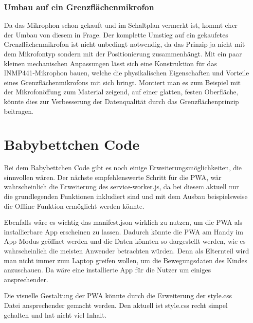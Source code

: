 \subsubsection{Umbau auf ein Grenzflächenmikrofon}
Da das Mikrophon schon gekauft und im Schaltplan vermerkt ist, kommt eher der Umbau von diesem in Frage. Der komplette Umstieg auf ein gekaufetes Grenzflächenmikrofon ist nicht unbedingt 
notwendig, da das Prinzip ja nicht mit dem Mikrofontyp sondern mit der Positionierung zusammenhängt. Mit ein paar kleinen mechanischen Anpassungen lässt sich eine Konstruktion 
für das INMP441-Mikrophon bauen, welche die physikalischen Eigenschaften und Vorteile eines Grenzflächenmikrofons mit sich bringt. Montiert man es zum Beispiel mit der Mikrofonöffung 
zum Material zeigend, auf einer glatten, festen Oberfläche, könnte dies zur Verbesserung der Datenqualität durch das Grenzflächenprinzip beitragen.

\section[Babybettchen Code]{Babybettchen Code\authorlinda}
Bei dem Babybettchen Code gibt es noch einige Erweiterungsmöglichkeiten, die sinnvollen wären. Der nächste empfehlenswerte Schritt für die PWA, wär wahrscheinlich die Erweiterung des service-worker.js, da bei diesem aktuell nur die grundlegenden Funktionen inkludiert sind und mit dem Ausbau beispielsweise die Offline Funktion ermöglicht werden könnte.

\par\vspace{1em}

\noindent
Ebenfalls wäre es wichtig das manifest.json wirklich zu nutzen, um die PWA als installierbare App erscheinen zu lassen. 
Dadurch könnte die PWA am Handy im App Modus geöffnet werden und die Daten könnten so dargestellt werden, wie es wahrscheinlich die meisten Anwender betrachten würden. 
Denn als Elternteil wird man nicht immer zum Laptop greifen wollen, um die Bewegungsdaten des Kindes anzuschauen. Da wäre eine installierte App für die Nutzer um einiges ansprechender. 

\par\vspace{1em}

\noindent
Die visuelle Gestaltung der PWA könnte durch die Erweiterung der style.css Datei ansprechender gemacht werden. Den aktuell ist style.css recht simpel gehalten und hat nicht viel Inhalt.

